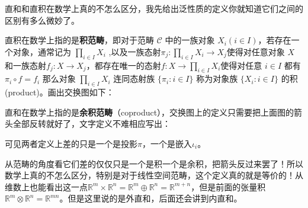 直和和直积在数学上真的不怎么区分，我先给出泛性质的定义你就知道它们之间的区别有多么微妙了。
\begin{definition}
	直积在数学上指的是\textbf{积范畴}，即对于范畴 $\mathcal{C}$ 中的一族对象 $X_i\left(i\in I\right)$，若存在一个对象，通常记为 $\prod_{i\in I}X_i$ ,以及一族态射$\pi_j:\prod_{i\in I}X_i\to X_j$使得对任意对象 $X$ 和一族态射$f_j:X\to X_j$，都存在唯一的态射$f:X\to\prod_{i\in I}X_i$使得对任意 $i\in I$ 都有$	\pi_i\circ f=f_i$
	那么对象 $\prod_{i\in I}X_i$ 连同态射族 $\{\pi_i:i\in I\}$ 称为对象族 $\{X_i:i\in I\}$ 的积(product)。画出交换图如下：
	\begin{center}
	\end{center}
\end{definition}

\begin{definition}
	直和在数学上指的是\textbf{余积范畴}（coproduct），交换图上的定义只需要把上面图的箭头全部反转就好了，文字定义不难相应写出：
	\begin{center}
	\end{center}
	可见两者定义上差的只是一个是投影$\pi$，一个是嵌入$\iota_i$。
\end{definition}
从范畴的角度看它们差的仅仅只是一个是积一个是余积，把箭头反过来罢了！所以数学上真的不怎么区分，特别是对于线性空间范畴，这个定义真的就是等价的！从维数上也能看出这一点$\mathbb{R}^m\times\mathbb{R}^n=\mathbb{R}^m\oplus\mathbb{R}^n=\mathbb{R}^{m+n}$，但是前面的张量积$\mathbb{R}^{m}\otimes\mathbb{R}^{n}=\mathbb{R}^{mn}$。但是这里说的是外直和，后面还会讲到内直和。

